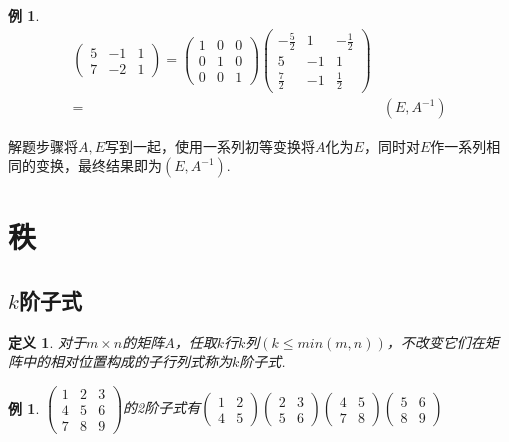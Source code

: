 \documentclass[12pt, a4paper, oneside]{ctexbook}
\newtheorem{definition}[theorem]{定义}
\newtheorem{example}[theorem]{例}
\begin{document}
\begin{example}
$$\begin{aligned}
\begin{pmatrix}
            5 & -1 & 1 \\
            7 & -2 & 1
        \end{pmatrix} = \begin{pmatrix}
            1 & 0 & 0 \\
            0 & 1 & 0 \\
            0 & 0 & 1
        \end{pmatrix} \begin{pmatrix}
            -\frac{5}{2} & 1 & -\frac{1}{2} \\
            5 & -1 & 1 \\
            \frac{7}{2} & -1 & \frac{1}{2}
        \end{pmatrix} \\
        =&(E, A^{-1})
    \end{aligned}$$
\end{example}

解题步骤将$A,E$写到一起，使用一系列初等变换将$A$化为$E$，同时对$E$作一系列相同的变换，最终结果即为$(E, A^{-1})$. 

\section{秩}

\subsection{$k$阶子式}

\begin{definition}
    对于$m \times n$的矩阵$A$，任取$k$行$k$列$(k \le min(m,n))$，不改变它们在矩阵中的相对位置构成的子行列式称为$k$阶子式. 
\end{definition}

\begin{example}
    $\begin{pmatrix}
        1 & 2 & 3 \\
        4 & 5 & 6 \\
        7 & 8 & 9
    \end{pmatrix}$的2阶子式有$\begin{pmatrix}
        1 & 2 \\
        4 & 5
    \end{pmatrix} \begin{pmatrix}
        2 & 3 \\
        5 & 6
    \end{pmatrix} \begin{pmatrix}
        4 & 5 \\
        7 & 8
    \end{pmatrix} \begin{pmatrix}
        5 & 6 \\
        8 & 9
    \end{pmatrix}$
\end{example}
\end{document}
